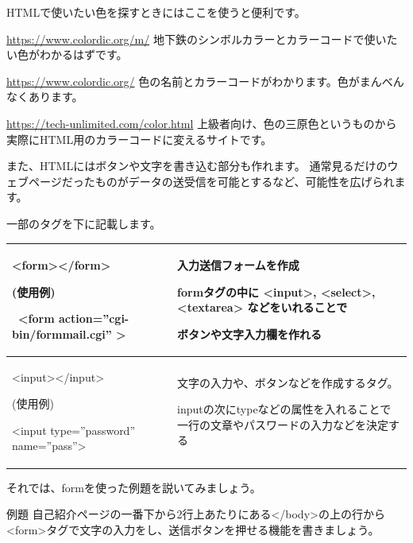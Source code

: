 \documentclass[a4paper,12pt,dvipdfmx]{jarticle}
\begin{document}
\bigskip

HTMLで使いたい色を探すときにはここを使うと便利です。

\url{https://www.colordic.org/m/}\newline
地下鉄のシンボルカラーとカラーコードで使いたい色がわかるはずです。

\url{https://www.colordic.org/}\newline
色の名前とカラーコードがわかります。色がまんべんなくあります。

\url{https://tech-unlimited.com/color.html}\newline
上級者向け、色の三原色というものから実際にHTML用のカラーコードに変えるサイトです。

\clearpage
また、HTMLにはボタンや文字を書き込む部分も作れます。\newline
通常見るだけのウェブページだったものがデータの送受信を可能とするなど、可能性を広げられます。

一部のタグを下に記載します。

\begin{center}
\tablefirsthead{}
\tablehead{}
\tabletail{}
\tablelasttail{}
\begin{supertabular}{|m{8.6cm}|m{7.91cm}|}
\hline
{\textless}form{\textgreater}{\textless}/form{\textgreater}

(使用例)

\ {\textless}form action=”cgi-bin/formmail.cgi” {\textgreater} &
入力送信フォームを作成

	formタグの中に
{\textless}input{\textgreater},
	{\textless}select{\textgreater},
	{\textless}textarea{\textgreater}
	などをいれることで

ボタンや文字入力欄を作れる\\\hline
{\textless}input{\textgreater}{\textless}/input{\textgreater}

(使用例)

{\textless}input type=”password” name=”pass”{\textgreater} &
文字の入力や、ボタンなどを作成するタグ。

inputの次にtypeなどの属性を入れることで一行の文章やパスワードの入力などを決定する\\\hline
\end{supertabular}
\end{center}

\bigskip

それでは、formを使った例題を説いてみましょう。

例題\newline
自己紹介ページの一番下から2行上あたりにある{\textless}/body{\textgreater}の上の行から{\textless}form{\textgreater}タグで文字の入力をし、送信ボタンを押せる機能を書きましょう。
\end{document}
